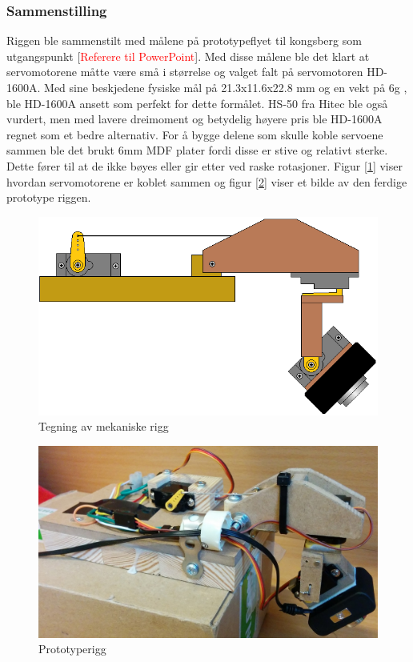 \subsubsection{Sammenstilling}
Riggen ble sammenstilt med målene på prototypeflyet til kongsberg som utgangspunkt [\textcolor{red}{Referere til PowerPoint}]. Med disse målene ble det klart at servomotorene måtte være små i størrelse og valget falt på servomotoren HD-1600A. Med sine beskjedene fysiske mål på 21.3x11.6x22.8 mm og en vekt på 6g \cite{PowerHD}, ble HD-1600A ansett som perfekt for dette formålet. HS-50 fra Hitec ble også vurdert, men med lavere dreimoment og betydelig høyere pris ble HD-1600A regnet som et bedre alternativ. For å bygge delene som skulle koble servoene sammen ble det brukt 6mm MDF plater fordi disse er stive og relativt sterke. Dette fører til at de ikke bøyes eller gir etter ved raske rotasjoner. Figur [\ref{fig:RiggTegn}] viser hvordan servomotorene er koblet sammen og figur [\ref{fig:RiggBilde}] viser et bilde av den ferdige prototype riggen. 

\begin{figure}[h!]
	\centering
	\includegraphics[scale=0.5]{img/RIGG_sattsammen.png}
	\caption{Tegning av mekaniske rigg}
	\label{fig:RiggTegn}
\end{figure}

\begin{figure}[h!]
	\centering
	\includegraphics[scale=0.25]{img/Rigg_Bilde.jpg}
	\caption{Prototyperigg}
	\label{fig:RiggBilde}
\end{figure}

